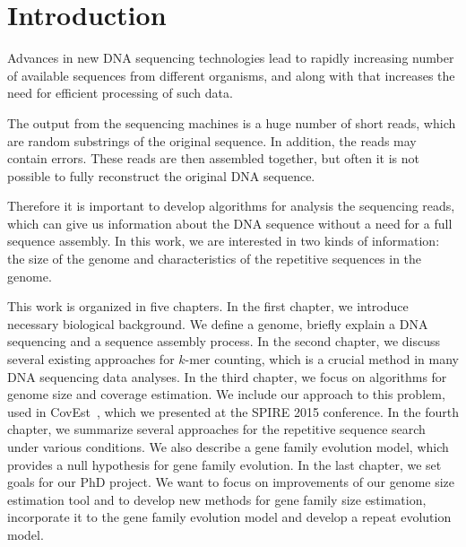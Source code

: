 \chapter*{Introduction}

Advances in new DNA sequencing technologies lead to rapidly increasing number of available sequences from different organisms, and along with that increases the need for efficient processing of such data.

The output from the sequencing machines is a huge number of short reads, which are random substrings of the original sequence. In addition, the reads may contain errors.
These reads are then assembled together, but often it is not possible to fully reconstruct the original DNA sequence.

Therefore it is important to develop algorithms for analysis the sequencing reads, which can give us information about the DNA sequence without a need for a full sequence assembly.
In this work, we are interested in two kinds of information: the size of the genome and characteristics of the repetitive sequences in the genome.

This work is organized in five chapters.
In the first chapter, we introduce necessary biological background. We define a genome, briefly explain a DNA sequencing and a sequence assembly process.
In the second chapter, we discuss several existing approaches for $k$-mer counting, which is a crucial method in many DNA sequencing data analyses.
In the third chapter, we focus on algorithms for genome size and coverage estimation. We include our approach to this problem, used in CovEst~\cite{covest}, which we presented at the SPIRE 2015 conference.
In the fourth chapter, we summarize several approaches for the repetitive sequence search under various conditions. We also describe a gene family evolution model, which provides a null hypothesis for gene family evolution.
In the last chapter, we set goals for our PhD project. We want to focus on improvements of our genome size estimation tool and to develop new methods for gene family size estimation, incorporate it to the gene family evolution model and develop a repeat evolution model.
